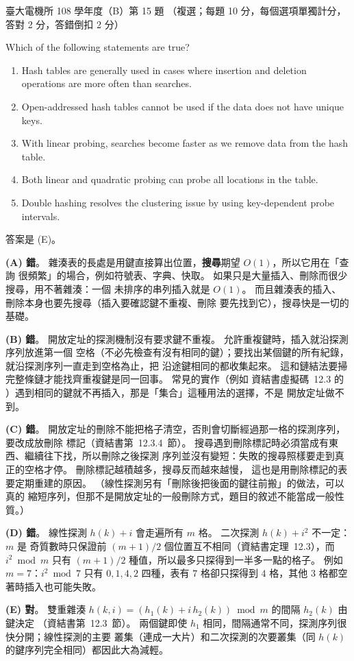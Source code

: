 \begin{pastexam}[label={px:ntu-108-ee-dsb-15}]{臺大電機所 108 學年度（B）第 15 題}
（複選；每題 10 分，每個選項單獨計分，答對 2 分，答錯倒扣 2 分）

Which of the following statements are true?
\begin{enumerate}[label=(\Alph*).]
\item Hash tables are generally used in cases where insertion and deletion operations are more
often than searches.
\item Open-addressed hash tables cannot be used if the data does not have unique keys.
\item With linear probing, searches become faster as we remove data from the hash table.
\item Both linear and quadratic probing can probe all locations in the table.
\item Double hashing resolves the clustering issue by using key-dependent probe intervals.
\end{enumerate}
\end{pastexam}

\begin{pastsoln}
答案是 (E)。

\textbf{(A) 錯}。 雜湊表的長處是用鍵直接算出位置，\textbf{搜尋}期望 $O(1)$，所以它用在「查詢
很頻繁」的場合，例如符號表、字典、快取。 如果只是大量插入、刪除而很少搜尋，用不著雜湊：一個
未排序的串列插入就是 $O(1)$。 而且雜湊表的插入、刪除本身也要先搜尋（插入要確認鍵不重複、刪除
要先找到它），搜尋快是一切的基礎。

\textbf{(B) 錯}。 開放定址的探測機制沒有要求鍵不重複。 允許重複鍵時，插入就沿探測序列放進第一個
空格（不必先檢查有沒有相同的鍵）；要找出某個鍵的所有紀錄，就沿探測序列一直走到空格為止，把
沿途鍵相同的都收集起來。 這和鏈結法要掃完整條鏈才能找齊重複鍵是同一回事。 常見的實作（例如
資結書虛擬碼~12.3 的 ）遇到相同的鍵就不再插入，那是「集合」這種用法的選擇，不是
開放定址做不到。

\textbf{(C) 錯}。 開放定址的刪除不能把格子清空，否則會切斷經過那一格的探測序列，要改成放刪除
標記（資結書第~12.3.4~節）。 搜尋遇到刪除標記時必須當成有東西、繼續往下找，所以刪除之後探測
序列並沒有變短：失敗的搜尋照樣要走到真正的空格才停。 刪除標記越積越多，搜尋反而越來越慢，
這也是用刪除標記的表要定期重建的原因。 （線性探測另有「刪除後把後面的鍵往前搬」的做法，可以真的
縮短序列，但那不是開放定址的一般刪除方式，題目的敘述不能當成一般性質。）

\textbf{(D) 錯}。 線性探測 $h(k) + i$ 會走遍所有 $m$ 格。 二次探測 $h(k) + i^2$ 不一定：$m$ 是
奇質數時只保證前 $(m + 1)/2$ 個位置互不相同（資結書定理~12.3），而 $i^2 \bmod m$ 只有
$(m+1)/2$ 種值，所以最多只探得到一半多一點的格子。 例如 $m = 7$：$i^2 \bmod 7$ 只有
$0, 1, 4, 2$ 四種，表有 $7$ 格卻只探得到 $4$ 格，其他 $3$ 格都空著時插入也可能失敗。

\textbf{(E) 對}。 雙重雜湊 $h(k, i) = (h_1(k) + i\, h_2(k)) \bmod m$ 的間隔 $h_2(k)$ 由鍵決定
（資結書第~12.3~節）。 兩個鍵即使 $h_1$ 相同，間隔通常不同，探測序列很快分開；線性探測的主要
叢集（連成一大片）和二次探測的次要叢集（同 $h(k)$ 的鍵序列完全相同）都因此大為減輕。
\end{pastsoln}
